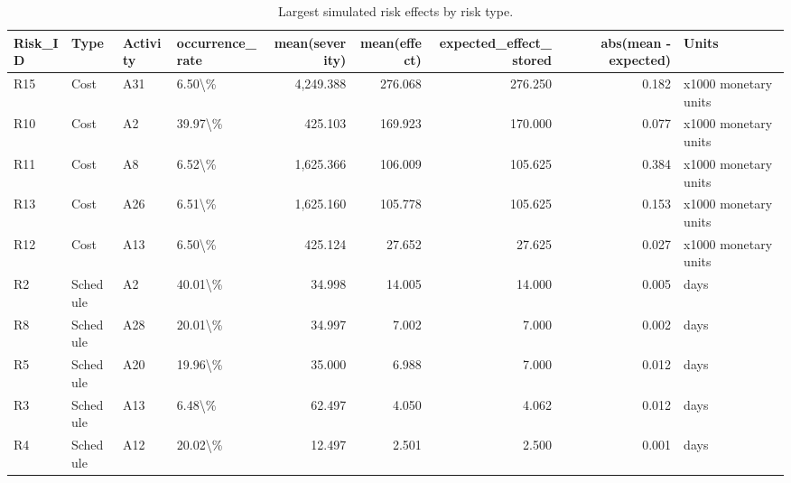 \begin{table}
\caption{Largest simulated risk effects by risk type.}
\label{tab:top-risk-effects}
\begin{tabular}{llllrrrrl}
\toprule
Risk\_ID & Type & Activity & occurrence\_rate & mean(severity) & mean(effect) & expected\_effect\_stored & abs(mean - expected) & Units \\
\midrule
R15 & Cost & A31 & 6.50\textbackslash \% & 4,249.388 & 276.068 & 276.250 & 0.182 & x1000 monetary units \\
R10 & Cost & A2 & 39.97\textbackslash \% & 425.103 & 169.923 & 170.000 & 0.077 & x1000 monetary units \\
R11 & Cost & A8 & 6.52\textbackslash \% & 1,625.366 & 106.009 & 105.625 & 0.384 & x1000 monetary units \\
R13 & Cost & A26 & 6.51\textbackslash \% & 1,625.160 & 105.778 & 105.625 & 0.153 & x1000 monetary units \\
R12 & Cost & A13 & 6.50\textbackslash \% & 425.124 & 27.652 & 27.625 & 0.027 & x1000 monetary units \\
R2 & Schedule & A2 & 40.01\textbackslash \% & 34.998 & 14.005 & 14.000 & 0.005 & days \\
R8 & Schedule & A28 & 20.01\textbackslash \% & 34.997 & 7.002 & 7.000 & 0.002 & days \\
R5 & Schedule & A20 & 19.96\textbackslash \% & 35.000 & 6.988 & 7.000 & 0.012 & days \\
R3 & Schedule & A13 & 6.48\textbackslash \% & 62.497 & 4.050 & 4.062 & 0.012 & days \\
R4 & Schedule & A12 & 20.02\textbackslash \% & 12.497 & 2.501 & 2.500 & 0.001 & days \\
\bottomrule
\end{tabular}
\end{table}
